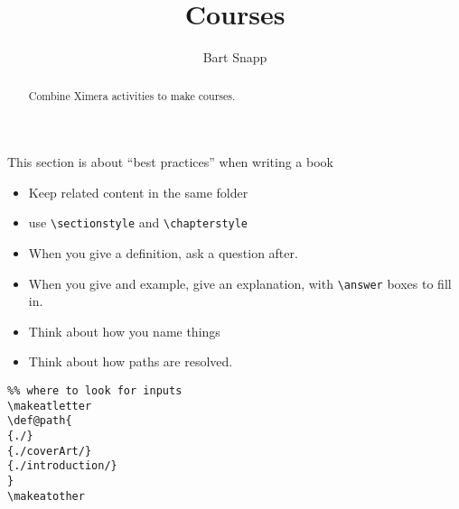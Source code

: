 \documentclass{ximera}
\title{Courses}
\author{Bart Snapp}
\begin{document}
\onecolumn
\begin{multicols}{2}
\begin{abstract}
    Combine Ximera activities to make courses.
\end{abstract}
\maketitle
This section is about ``best practices'' when writing a book
\begin{itemize}
    \item Keep related content in the same folder
    \item use \texttt{\textbackslash sectionstyle} and
          \texttt{\textbackslash chapterstyle}
    \item When you give a definition, ask a question after.
    \item When you give and example, give an explanation, with
          \texttt{\textbackslash answer} boxes to fill in.
    \item Think about how you name things
    \item Think about how paths are resolved.
\end{itemize}


\begin{example}
    \begin{verbatim} 
%% where to look for inputs
\makeatletter
\def@path{
{./}
{./coverArt/}
{./introduction/}
}
\makeatother   
\end{verbatim}
\end{example}

\end{multicols}
\end{document}
